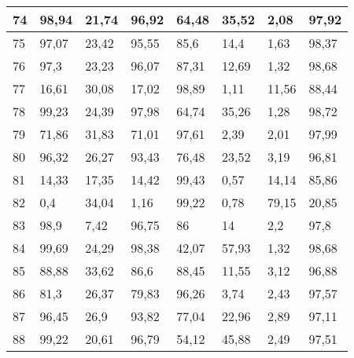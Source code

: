 \begin{longtable}[c]{|l|l|l|l|l|l|l|l|}
74              & 98,94        & 21,74        & 96,92       & 64,48         & 35,52         & 2,08          & 97,92         \\ \hline
75              & 97,07        & 23,42        & 95,55       & 85,6          & 14,4          & 1,63          & 98,37         \\ \hline
76              & 97,3         & 23,23        & 96,07       & 87,31         & 12,69         & 1,32          & 98,68         \\ \hline
77              & 16,61        & 30,08        & 17,02       & 98,89         & 1,11          & 11,56         & 88,44         \\ \hline
78              & 99,23        & 24,39        & 97,98       & 64,74         & 35,26         & 1,28          & 98,72         \\ \hline
79              & 71,86        & 31,83        & 71,01       & 97,61         & 2,39          & 2,01          & 97,99         \\ \hline
80              & 96,32        & 26,27        & 93,43       & 76,48         & 23,52         & 3,19          & 96,81         \\ \hline
81              & 14,33        & 17,35        & 14,42       & 99,43         & 0,57          & 14,14         & 85,86         \\ \hline
82              & 0,4          & 34,04        & 1,16        & 99,22         & 0,78          & 79,15         & 20,85         \\ \hline
83              & 98,9         & 7,42         & 96,75       & 86            & 14            & 2,2           & 97,8          \\ \hline
84              & 99,69        & 24,29        & 98,38       & 42,07         & 57,93         & 1,32          & 98,68         \\ \hline
85              & 88,88        & 33,62        & 86,6        & 88,45         & 11,55         & 3,12          & 96,88         \\ \hline
86              & 81,3         & 26,37        & 79,83       & 96,26         & 3,74          & 2,43          & 97,57         \\ \hline
87              & 96,45        & 26,9         & 93,82       & 77,04         & 22,96         & 2,89          & 97,11         \\ \hline
88              & 99,22        & 20,61        & 96,79       & 54,12         & 45,88         & 2,49          & 97,51         \\ \hline

\end{longtable}
